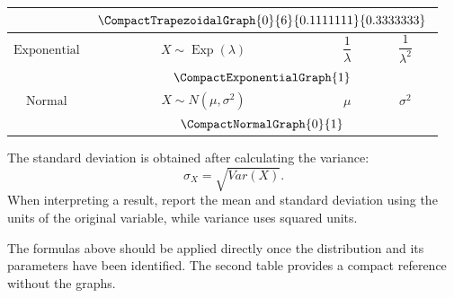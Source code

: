 {\begin{longtable}{c|c|c|c}
			&
			\multicolumn{3}{c}{
				$\vcenter{\hbox{
						\CompactTrapezoidalGraph{0}{6}{0.1111111}{0.3333333}
				}}$
			}
			\\[5mm]
			\hline
			
			$\text{Exponential}$
			&
			$X\sim \operatorname{Exp}(\lambda)$
			&
			$\dfrac{1}{\lambda}$
			&
			$\dfrac{1}{\lambda^2}$
			\\[2mm]
			
			&
			\multicolumn{3}{c}{
				$\vcenter{\hbox{\CompactExponentialGraph{1}}}$
			}
			\\[5mm]
			\hline
			
			$\text{Normal}$
			&
			$X\sim N(\mu,\sigma^2)$
			&
			$\mu$
			&
			$\sigma^2$
			\\[2mm]
			
			&
			\multicolumn{3}{c}{
				$\vcenter{\hbox{\CompactNormalGraph{0}{1}}}$
			}
			
		\end{longtable}
	}
	
	The standard deviation is obtained after calculating the variance:
	\[
	\sigma_X=\sqrt{Var(X)}.
	\]
	When interpreting a result, report the mean and standard deviation using the
	units of the original variable, while variance uses squared units.
	
	The formulas above should be applied directly once the distribution and its
	parameters have been identified.  The second table provides a compact
	reference without the graphs.
	
